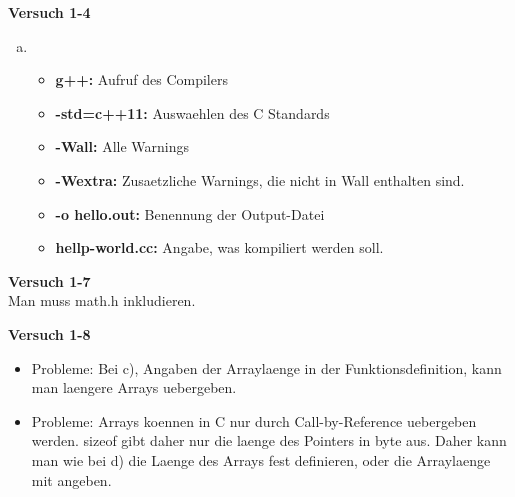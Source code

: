 \documentclass[german,10pt,oneside, fleqn, a4paper]{article}
\begin{document}
{\bf Versuch 1-4} \\[2ex]
\begin{enumerate}[b)]
	\item 
		\begin{itemize}
			\item {\bf{g++:}} Aufruf des Compilers
			\item {\bf{-std=c++11:}} Auswaehlen des C Standards
			\item {\bf{-Wall:}} Alle Warnings
			\item {\bf{-Wextra:}} Zusaetzliche Warnings, die nicht in Wall enthalten sind.
			\item {\bf{-o hello.out:}} Benennung der Output-Datei
			\item {\bf{hellp-world.cc:}} Angabe, was kompiliert werden soll.
		\end{itemize}
\end{enumerate}

{\bf Versuch 1-7} \\[2ex]
Man muss math.h inkludieren.


{\bf Versuch 1-8} \\[2ex]
\begin{itemize}
	\item Probleme: Bei c), Angaben der Arraylaenge in der Funktionsdefinition, kann man laengere Arrays uebergeben.
	 \item Probleme: Arrays koennen in C nur durch Call-by-Reference uebergeben werden. sizeof gibt daher nur die laenge des Pointers in byte aus.
	 Daher kann man wie bei d) die Laenge des Arrays fest definieren, oder die Arraylaenge mit angeben.

\end{itemize}
\end{document}
